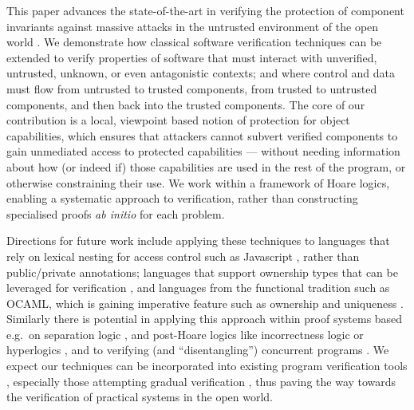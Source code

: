 
This paper advances the state-of-the-art in verifying the protection
of component invariants against massive
attacks \cite{massive-attack-protection} in the untrusted environment
of the open world \cite{baresi2006toward,swapsies}.
%
We demonstrate how classical software verification techniques
can be extended to verify properties of software that must
interact with unverified, untrusted, unknown, or even antagonistic
contexts; and where control and data must flow from untrusted to
trusted components, from trusted to untrusted components, and then
back into the trusted components.
%
The core of our contribution is a local, viewpoint based notion of
protection for object capabilities, which ensures that attackers
cannot subvert verified components to gain unmediated access to
protected capabilities --- without needing information about how (or
indeed if) those capabilities are used in the rest of the program, or
otherwise constraining their use.  We work within a framework of Hoare
logics, enabling a systematic approach to
verification, rather than constructing specialised proofs \textit{ab
initio} for each problem. 


Directions for future work include applying these techniques to
languages that rely on lexical nesting for access
control such as Javascript \cite{ooToSecurity},
rather than public/private annotations;
languages that support ownership types that can be leveraged for
verification
\cite{RustHornBelt-pldi2022,verus-oopsla2023},
and languages from the
functional tradition such as OCAML, which is gaining imperative
feature such as ownership and uniqueness \cite{funk-ownership2024,ocaml-ownership-icfp2024}. 
%
Similarly there is potential in applying this approach within
proof systems based e.g.\ on separation logic \cite{cerise-jacm2024},
and post-Hoare logics like incorrectness logic \cite{IncorrectnessLogic} or
hyperlogics \cite{compositional-hypersafety-oopsla2022,hyper-hoare-pldi2024},
and to verifying (and ``disentangling'') concurrent programs \cite{seplog-disentanglelment-popl2024}.
%
We expect our techniques can be incorporated into existing program
verification tools \cite{Cok2022}, especially those attempting
gradual verification \cite{gradual-verification-popl2024},
thus paving the way towards the verification of
practical systems in the open world.






